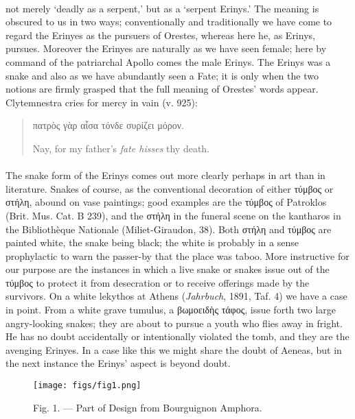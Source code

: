 \documentclass[a4paper, 11pt, oneside, polutonikogreek, english]{article}
\begin{document}
\paragraph{}
not merely `deadly as a serpent,' but as a `serpent Erinys.' The meaning is obscured to us in two ways; conventionally and traditionally we have come to regard the Erinyes as the pursuers of Orestes, whereas here he, as Erinys, pursues. Moreover the Erinyes are naturally as we have seen female; here by command of the patriarchal Apollo comes the male Erinys. The Erinys was a snake and also as we have abundantly seen a Fate; it is only when the two notions are firmly grasped that the full meaning of Orestes' words appear. Clytemnestra cries for mercy in vain (v. 925):
\begin{quotation}
πατρὸς γὰρ αἶσα τόνδε συρίζει μόρον.

Nay, for my father's \emph{fate hisses} thy death.
\end{quotation}
\paragraph{}
The snake form of the Erinys comes out more clearly perhaps in art than in literature. Snakes of course, as the conventional decoration of either τύμβος or στήλη, abound on vase paintings; good examples are the τύμβος of Patroklos (Brit. Mus. Cat. B 239), and the στήλη in the funeral scene on the kantharos in the Bibliothèque Nationale (Miliet-Giraudon, 38). Both στήλη and τύμβος are painted white, the snake being black; the white is probably in a sense prophylactic to warn the passer-by that the place was taboo. More instructive for our purpose are the instances in which a live snake or snakes issue out of the τύμβος to protect it from desecration or to receive offerings made by the survivors. On a white lekythos at Athens (\emph{Jahrbuch}, 1891, Taf. 4) we have a case in point. From a white grave tumulus, a βωμοειδὴς τάφος, issue forth two large angry-looking snakes; they are about to pursue a youth who flies away in fright. He has no doubt accidentally or intentionally violated the tomb, and they are the avenging Erinyes. In a case like this we might share the doubt of Aeneas, but in the next instance the Erinys' aspect is beyond doubt.
\begin{figure}[H]
\centering
\texttt{[image: figs/fig1.png]}
\caption{Fig. 1. --- Part of Design from Bourguignon Amphora.}
\end{figure}
\end{document}
